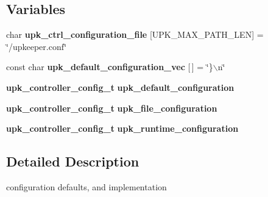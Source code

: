 \subsection*{Variables}
\begin{DoxyCompactItemize}
\item 
char {\bf upk\_\-ctrl\_\-configuration\_\-file} [UPK\_\-MAX\_\-PATH\_\-LEN] = \char`\"{}/upkeeper.conf\char`\"{}
\item 
const char {\bf upk\_\-default\_\-configuration\_\-vec} [$\,$] = \char`\"{}\}$\backslash$n\char`\"{}
\item 
{\bf upk\_\-controller\_\-config\_\-t} {\bf upk\_\-default\_\-configuration}
\item 
{\bf upk\_\-controller\_\-config\_\-t} {\bf upk\_\-file\_\-configuration}
\item 
{\bf upk\_\-controller\_\-config\_\-t} {\bf upk\_\-runtime\_\-configuration}
\end{DoxyCompactItemize}


\subsection{Detailed Description}
configuration defaults, and implementation 